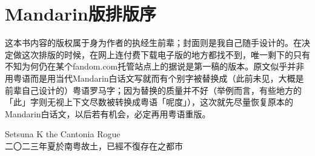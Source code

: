 
\chapter*{Mandarin版排版序}

\indent 这本书内容的版权属于身为作者的执经生前辈；封面则是我自己随手设计的。在决定做这次排版的时候，在网上连付费下载电子版的地方都找不到，唯一剩下的只有不知为何仍在某个fandom.com托管站点上的据说是第一稿的版本。原文似乎并非用粤语而是用当代Mandarin白话文写就而有个别字被替换成（此前未见，大概是前辈自己设计的）粤语罗马字；因为替换的质量并不好（举例而言，有些地方的「此」字则无视上下文尽数被转换成粤语「呢度」），这次就先尽量恢复原本的Mandarin白话文，以后若有机会，必定再用粤语重版。

\begin{flushright}
	Setsuna K the Cantonia Rogue \\
	二〇二三年夏於南粤故土，已經不復存在之都市
\end{flushright}